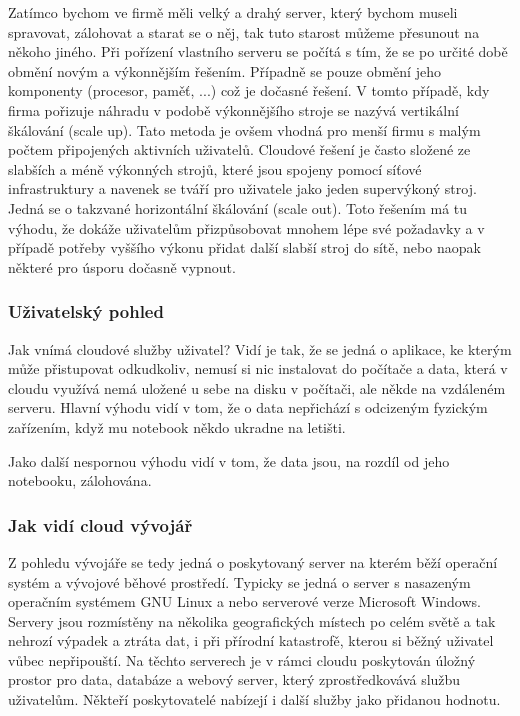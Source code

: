 Zatímco bychom ve firmě měli velký a drahý server, který bychom museli spravovat, zálohovat a starat se o něj, tak tuto starost můžeme přesunout na někoho jiného. Při pořízení vlastního serveru se počítá s tím, že se po určité době obmění novým a výkonnějším řešením. Případně se pouze obmění jeho komponenty (procesor, paměť, ...) což je dočasné řešení. V tomto případě, kdy firma pořizuje náhradu v podobě výkonnějšího stroje se nazývá vertikální škálování (scale up). Tato metoda je ovšem vhodná pro menší firmu s malým počtem připojených aktivních uživatelů. Cloudové řešení je často složené ze slabších a méně výkonných strojů, které jsou spojeny pomocí síťové infrastruktury a navenek se tváří pro uživatele jako jeden supervýkoný stroj. Jedná se o takzvané horizontální škálování (scale out). Toto řešením má tu výhodu, že dokáže uživatelům přizpůsobovat mnohem lépe své požadavky a v případě potřeby vyššího výkonu přidat další slabší stroj do sítě, nebo naopak některé pro úsporu dočasně vypnout.\nocite{wiki:Skalovatelnost}

\subsubsection{Uživatelský pohled}
Jak vnímá cloudové služby uživatel? Vidí je tak, že se jedná o aplikace, ke kterým může přistupovat odkudkoliv, nemusí si nic instalovat do počítače a data, která v cloudu využívá nemá uložené u sebe na disku v počítači, ale někde na vzdáleném serveru. Hlavní výhodu vidí v tom, že o data nepřichází s odcizeným fyzickým zařízením, když mu notebook někdo ukradne na letišti.

Jako další nespornou výhodu vidí v tom, že data jsou, na rozdíl od jeho notebooku, zálohována.

\subsubsection{Jak vidí cloud vývojář}
Z pohledu vývojáře se tedy jedná o poskytovaný server na kterém běží operační systém a vývojové běhové prostředí. Typicky se jedná o server s nasazeným operačním systémem GNU Linux a nebo serverové verze Microsoft Windows. Servery jsou rozmístěny na několika geografických místech po celém světě a tak nehrozí výpadek a ztráta dat, i při přírodní katastrofě, kterou si běžný uživatel vůbec nepřipouští. Na těchto serverech je v rámci cloudu poskytován úložný prostor pro data, databáze a webový server, který zprostředkovává službu uživatelům. Někteří poskytovatelé nabízejí i další služby jako přidanou hodnotu.

